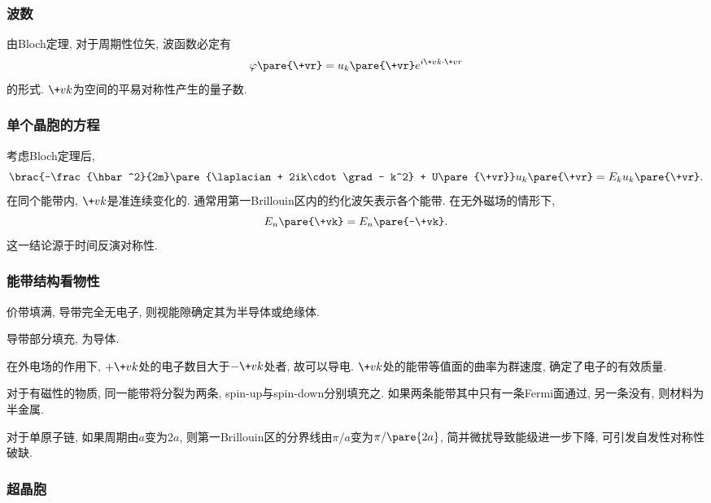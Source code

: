 \documentclass[hidelinks]{ctexart}
\begin{document}
\subsubsection{波数} %
\label{ssub:波数}

由Bloch定理, 对于周期性位矢, 波函数必定有
\[ \varphi\pare{\+vr} = u_k\pare{\+vr}e^{i\+vk\cdot \+vr} \]
的形式. $\+vk$为空间的平易对称性产生的量子数.


\subsubsection{单个晶胞的方程} %
\label{ssub:单个晶胞的方程}

考虑Bloch定理后,
\[ \brac{-\frac{\hbar^2}{2m}\pare{\laplacian + 2ik\cdot \grad - k^2} + U\pare{\+vr}}u_k\pare{\+vr} = E_k u_k\pare{\+vr}. \]
在同个能带内, $\+vk$是准连续变化的. 通常用第一Brillouin区内的约化波矢表示各个能带. 在无外磁场的情形下,
\[ E_n\pare{\+vk} = E_n\pare{-\+vk}. \]
这一结论源于时间反演对称性.


\subsubsection{能带结构看物性} %
\label{ssub:能带结构看物性}

\begin{cenum}
    \item 价带填满, 导带完全无电子, 则视能隙确定其为半导体或绝缘体.
    \item 导带部分填充, 为导体.
\end{cenum}
在外电场的作用下, $+\+vk$处的电子数目大于$-\+vk$处者, 故可以导电. $\+vk$处的能带等值面的曲率为群速度, 确定了电子的有效质量.
\par
对于有磁性的物质, 同一能带将分裂为两条, spin-up与spin-down分别填充之. 如果两条能带其中只有一条Fermi面通过, 另一条没有, 则材料为半金属.
\par
对于单原子链, 如果周期由$a$变为$2a$, 则第一Brillouin区的分界线由$\pi / a$变为$\pi/\pare{2a}$, 简并微扰导致能级进一步下降, 可引发自发性对称性破缺.


\subsubsection{超晶胞} %
\label{ssub:超晶胞}
\end{document}
